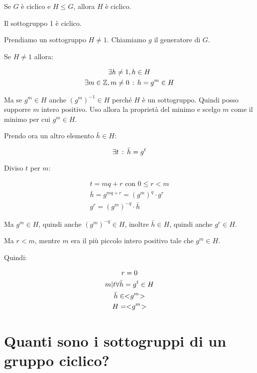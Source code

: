\begin{teorema}
	Se $G$ è ciclico e $H \le G$, allora $H$ è ciclico.
\end{teorema}
\begin{dimostrazione}
	Il sottogruppo 1 è ciclico.
	
	Prendiamo un sottogruppo $H \ne 1$. Chiamiamo $g$ il generatore di $G$.
	
	Se $H \ne 1$ allora:
	
	\begin{gather}
		\exists h \ne 1, h \in H \\
		\exists m \in \mathbb{Z}, m \ne 0 \,:\, h = g^m \in H
	\end{gather}

	Ma se $g^m \in H$ anche $(g^m)^{-1} \in H$ perché $H$ è un sottogruppo. Quindi posso supporre $m$ intero positivo. Uso allora la proprietà del minimo e scelgo $m$ come il minimo per cui $g^m \in H$.
	
	Prendo ora un altro elemento $\bar{h} \in H$:
	
	\begin{equation}
		\exists t \,:\, \bar{h} = g^t
	\end{equation}

	Diviso $t$ per $m$:
	
	\begin{gather}
		t = mq + r \text{ con } 0 \le r < m \\
		\bar{h} = g^{mq + r} = (g^m)^q \cdot g^r \\
		g^r = (g^m)^{-q} \cdot \bar{h}
	\end{gather}

	Ma $g^m \in H$, quindi anche $(g^m)^{-q} \in H$, inoltre $\bar{h} \in H$, quindi anche $g^r \in H$.
	
	Ma $r < m$, mentre $m$ era il più piccolo intero positivo tale che $g^m \in H$.
	
	Quindi:
	
	\begin{gather}
		r = 0 \\
		m|t \forall \bar{h} = g^t \in H \\
		\bar{h} \in < \negmedspace g^m \negmedspace > \\
		H = < \negmedspace g^m \negmedspace >
	\end{gather}
\end{dimostrazione}

\section{Quanti sono i sottogruppi di un gruppo ciclico?}

